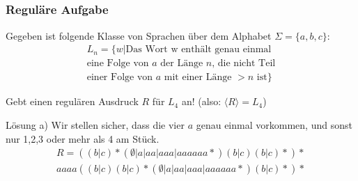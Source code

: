 \subsection*{}
\begin{frame}
  \frametitle{Reguläre Aufgabe}

  Gegeben ist folgende Klasse von Sprachen über dem Alphabet $\Sigma = \{a,b,c\}$:
  \begin{multline*}
    L_n = \{w|
      \text{Das Wort w enthält genau einmal}\\
      \text{eine Folge von $a$ der Länge $n$, die nicht Teil}\\
      \text{einer Folge von $a$ mit einer Länge $>n$ ist}
          \}
  \end{multline*}

  Gebt einen regulären Ausdruck $R$ für $L_4$ an! (also: $\langle R \rangle = L_4$)

  \hide

  \begin{block}{Lösung a)}
    Wir stellen sicher, dass die vier $a$ genau einmal vorkommen, und sonst nur 1,2,3 oder mehr als 4 am Stück.
    \begin{multline*}
      R = ( (b|c)* (\emptyset |a|aa|aaa|aaaaaa*)(b|c)(b|c)*)* \\ aaaa (
      (b|c)(b|c)*(\emptyset |a|aa|aaa|aaaaaa* )(b|c)*)*
    \end{multline*}
  \end{block}
\end{frame}


